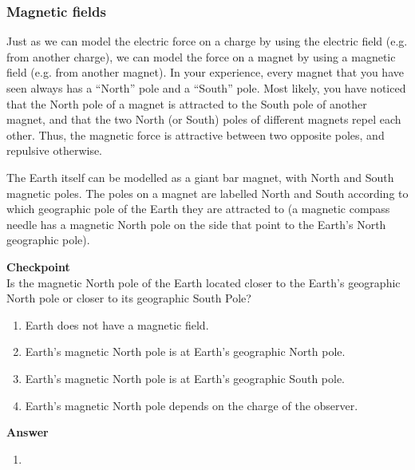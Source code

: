 \subsubsection{Magnetic fields}

Just as we can model the electric force on a charge by using the electric field (e.g. from another charge), we can model the force on a magnet by using a magnetic field (e.g. from another magnet). In your experience, every magnet that you have seen always has a ``North'' pole and a ``South'' pole. Most likely, you have noticed that the North pole of a magnet is attracted to the South pole of another magnet, and that the two North (or South) poles of different magnets repel each other. Thus, the magnetic force is attractive between two opposite poles, and repulsive otherwise.

The Earth itself can be modelled as a giant bar magnet, with North and South magnetic poles. The poles on a magnet are labelled North and South according to which geographic pole of the Earth they are attracted to (a magnetic compass needle has a magnetic North pole on the side that point to the Earth's North geographic pole).

\begin{framed}
\textbf{Checkpoint}\\
Is the magnetic North pole of the Earth located closer to the Earth's geographic North pole or closer to its geographic South Pole?

\begin{enumerate}
\item Earth does not have a magnetic field.
\item Earth's magnetic North pole is at Earth's geographic North pole.
\item Earth's magnetic North pole is at Earth's geographic South pole.
\item Earth's magnetic North pole depends on the charge of the observer.
\end{enumerate}

\begin{framed}
\textbf{Answer}\\
\begin{enumerate}[resume]
\item
\end{enumerate}
\end{framed}
\end{framed}

